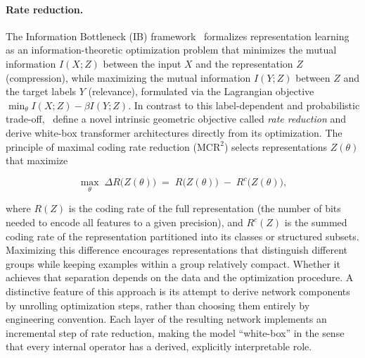 \documentclass[acmsmall,screen,review,anonymous]{acmart}
\begin{document}
\paragraph{Rate reduction.} The Information Bottleneck (IB) framework~\citep{tishby2000informationbottleneckmethod, michael2018on} formalizes representation learning as an information-theoretic optimization problem that minimizes the mutual information $I(X; Z)$ between the input $X$ and the representation $Z$ (compression), while maximizing the mutual information $I(Y; Z)$ between $Z$ and the target labels $Y$ (relevance), formulated via the Lagrangian objective $\min_{\theta} I(X; Z) - \beta I(Y; Z)$. 
In contrast to this label-dependent and probabilistic trade-off,~\citet{ma2022, chan2021redunetwhiteboxdeepnetwork} define a novel intrinsic geometric objective called \emph{rate reduction} and derive white-box transformer architectures directly from its optimization.
%
The principle of maximal coding rate reduction ($\mathrm{MCR}^2$) selects representations $Z(\theta)$ that maximize 

\begin{equation}
\label{eq:mcr2}
\max_{\theta}\;\Delta R\big(Z(\theta)\big) \;=\; R\big(Z(\theta)\big) \;-\; R^{c}\big(Z(\theta)\big),
\end{equation}

where $R(Z)$ is the coding rate of the full representation (the number of bits needed to encode all features to a given precision), and $R^{c}(Z)$ is the summed coding rate of the representation partitioned into its classes or structured subsets. 
%
Maximizing this difference encourages representations that distinguish different groups while keeping examples within a group relatively compact.
%
Whether it achieves that separation depends on the data and the optimization procedure.
%
A distinctive feature of this approach is its attempt to derive network components by unrolling optimization steps, rather than choosing them entirely by engineering convention.
%
Each layer of the resulting network implements an incremental step of rate reduction, making the model ``white-box'' in the sense that every internal operator has a derived, explicitly interpretable role. 
\end{document}
